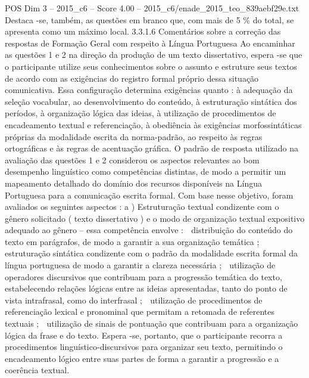 \begin{textsample}{POS Dim 3 – 2015\_c6 – Score 4.00 – 2015\_c6/enade\_2015\_teo\_839aebf29e.txt}
Destaca -se, também, as questões em branco que, com mais de 5 \% do total, se apresenta como um máximo local. 3.3.1.6 Comentários sobre a correção das respostas de Formação Geral com respeito à Língua Portuguesa Ao encaminhar as questões 1 e 2 na direção da produção de um texto dissertativo, espera -se que o participante utilize seus conhecimentos sobre o assunto e estruture seus textos de acordo com as exigências do registro formal próprio dessa situação comunicativa.
Essa configuração determina exigências quanto : à adequação da seleção vocabular, ao desenvolvimento do conteúdo, à estruturação sintática dos períodos, à organização lógica das ideias, à utilização de procedimentos de encadeamento textual e referenciação, à obediência às exigências morfossintáticas próprias da modalidade escrita da norma-padrão, ao respeito às regras ortográficas e às regras de acentuação gráfica.
O padrão de resposta utilizado na avaliação das questões 1 e 2 considerou os aspectos relevantes ao bom desempenho linguístico como competências distintas, de modo a permitir um mapeamento detalhado do domínio dos recursos disponíveis na Língua Portuguesa para a comunicação escrita formal.
Com base nesse objetivo, foram avaliados os seguintes aspectos : a ) Estruturação textual condizente com o gênero solicitado ( texto dissertativo ) e o modo de organização textual expositivo adequado ao gênero – essa competência envolve :  distribuição do conteúdo do texto em parágrafos, de modo a garantir a sua organização temática ;  estruturação sintática condizente com o padrão da modalidade escrita formal da língua portuguesa de modo a garantir a clareza necessária ;  utilização de operadores discursivos que contribuam para a progressão temática do texto, estabelecendo relações lógicas entre as ideias apresentadas, tanto do ponto de vista intrafrasal, como do interfrasal ;  utilização de procedimentos de referenciação lexical e pronominal que permitam a retomada de referentes textuais ;  utilização de sinais de pontuação que contribuam para a organização lógica da frase e do texto.
Espera -se, portanto, que o participante recorra a procedimentos linguístico-discursivos para organizar seu texto, permitindo o encadeamento lógico entre suas partes de forma a garantir a progressão e a coerência textual.

\end{textsample}
